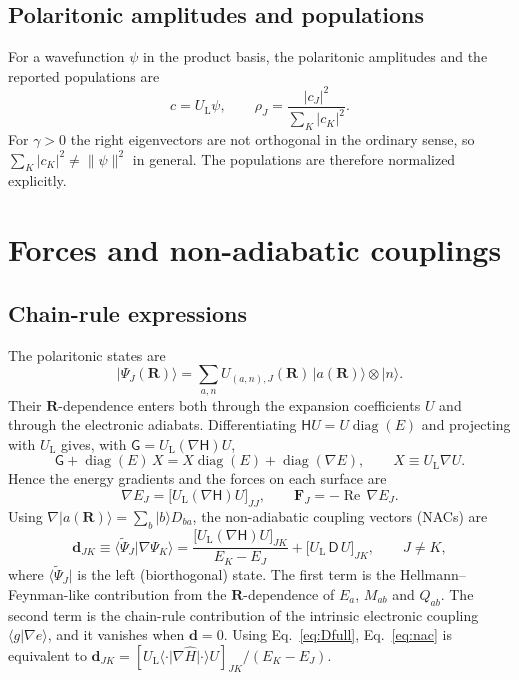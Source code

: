 \documentclass[11pt]{article}
\newcommand{\ket}[1]{\lvert #1 \rangle}
\newcommand{\bra}[1]{\langle #1 \rvert}
\newcommand{\braket}[2]{\langle #1 \vert #2 \rangle}
\newcommand{\R}{\mathbf{R}}
\newcommand{\grad}{\nabla}
\newcommand{\dd}{\mathbf{d}}
\newcommand{\UL}{U_{\mathrm L}}
\newcommand{\Hm}{\mathsf{H}}
\newcommand{\Dm}{\mathsf{D}}
\newcommand{\Gm}{\mathsf{G}}
\newcommand{\Rep}{\operatorname{Re}}
\begin{document}
\subsection{Polaritonic amplitudes and populations}
For a wavefunction $\psi$ in the product basis, the polaritonic amplitudes and the reported populations are
\begin{equation}
c=\UL\psi,\qquad \rho_J=\frac{|c_J|^2}{\sum_K|c_K|^2}.
\end{equation}
For $\gamma>0$ the right eigenvectors are not orthogonal in the ordinary sense, so $\sum_K|c_K|^2\neq\|\psi\|^2$ in general. The populations are therefore normalized explicitly.

\section{Forces and non-adiabatic couplings}
\subsection{Chain-rule expressions}
The polaritonic states are
\begin{equation}
\ket{\Psi_J(\R)}=\sum_{a,n}U_{(a,n),J}(\R)\,\ket{a(\R)}\otimes\ket n .
\end{equation}
Their $\R$-dependence enters both through the expansion coefficients $U$ and through the electronic adiabats. Differentiating $\Hm U=U\operatorname{diag}(E)$ and projecting with $\UL$ gives, with $\Gm=\UL(\grad\Hm)U$,
\begin{equation}
\Gm+\operatorname{diag}(E)\,X=X\operatorname{diag}(E)+\operatorname{diag}(\grad E),\qquad X\equiv\UL\grad U .
\end{equation}
Hence the energy gradients and the forces on each surface are
\begin{equation}
\grad E_J=\big[\UL(\grad\Hm)U\big]_{JJ},\qquad \mathbf F_J=-\Rep\,\grad E_J .
\label{eq:force}
\end{equation}
Using $\grad\ket{a(\R)}=\sum_b\ket{b}D_{ba}$, the non-adiabatic coupling vectors (NACs) are
\begin{equation}
\boxed{\;
\dd_{JK}\equiv\braket{\tilde\Psi_J}{\grad\Psi_K}
=\frac{\big[\UL(\grad\Hm)U\big]_{JK}}{E_K-E_J}
+\big[\UL\,\Dm\,U\big]_{JK},\qquad J\neq K,\;}
\label{eq:nac}
\end{equation}
where $\bra{\tilde\Psi_J}$ is the left (biorthogonal) state. The first term is the Hellmann--Feynman-like contribution from the $\R$-dependence of $E_a$, $M_{ab}$ and $Q_{ab}$. The second term is the chain-rule contribution of the intrinsic electronic coupling $\braket{g}{\grad e}$, and it vanishes when $\dd=0$. Using Eq.~\eqref{eq:Dfull}, Eq.~\eqref{eq:nac} is equivalent to $\dd_{JK}=[\UL\bra{\cdot}\grad\hat H\ket{\cdot}U]_{JK}/(E_K-E_J)$.
\end{document}
